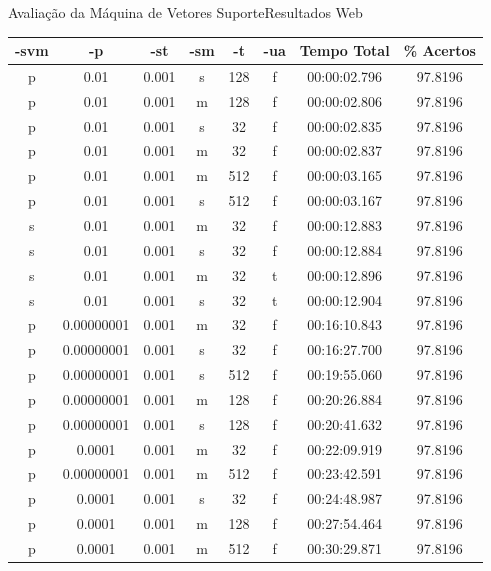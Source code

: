\documentclass{beamer}
\begin{document}
\begin{frame}{Avaliação da Máquina de Vetores Suporte}{Resultados Web}

\begin{table}
    \footnotesize
    \centering
    \tabcolsep=0.11cm
    \begin{tabular}{|c|c|c|c|c|c|c|c|} \hline
		-svm & -p & -st & -sm & -t & -ua & Tempo Total & \% Acertos\\ \hline
		p & 0.01 & 0.001 & s & 128 & f & 00:00:02.796 & 97.8196\\ \hline
		p & 0.01 & 0.001 & m & 128 & f & 00:00:02.806 & 97.8196\\ \hline
		p & 0.01 & 0.001 & s & 32 & f & 00:00:02.835 & 97.8196\\ \hline
		p & 0.01 & 0.001 & m & 32 & f & 00:00:02.837 & 97.8196\\ \hline
		p & 0.01 & 0.001 & m & 512 & f & 00:00:03.165 & 97.8196\\ \hline
		p & 0.01 & 0.001 & s & 512 & f & 00:00:03.167 & 97.8196\\ \hline
		s & 0.01 & 0.001 & m & 32 & f & 00:00:12.883 & 97.8196\\ \hline
		s & 0.01 & 0.001 & s & 32 & f & 00:00:12.884 & 97.8196\\ \hline
		s & 0.01 & 0.001 & m & 32 & t & 00:00:12.896 & 97.8196\\ \hline
		s & 0.01 & 0.001 & s & 32 & t & 00:00:12.904 & 97.8196\\ \hline
		p & 0.00000001 & 0.001 & m & 32 & f & 00:16:10.843 & 97.8196\\ \hline
		p & 0.00000001 & 0.001 & s & 32 & f & 00:16:27.700 & 97.8196\\ \hline
		p & 0.00000001 & 0.001 & s & 512 & f & 00:19:55.060 & 97.8196\\ \hline
		p & 0.00000001 & 0.001 & m & 128 & f & 00:20:26.884 & 97.8196\\ \hline
		p & 0.00000001 & 0.001 & s & 128 & f & 00:20:41.632 & 97.8196\\ \hline
		p & 0.0001 & 0.001 & m & 32 & f & 00:22:09.919 & 97.8196\\ \hline
		p & 0.00000001 & 0.001 & m & 512 & f & 00:23:42.591 & 97.8196\\ \hline
		p & 0.0001 & 0.001 & s & 32 & f & 00:24:48.987 & 97.8196\\ \hline
		p & 0.0001 & 0.001 & m & 128 & f & 00:27:54.464 & 97.8196\\ \hline
		p & 0.0001 & 0.001 & m & 512 & f & 00:30:29.871 & 97.8196\\ \hline

\end{tabular}
\end{table}
\end{frame}
\end{document}
